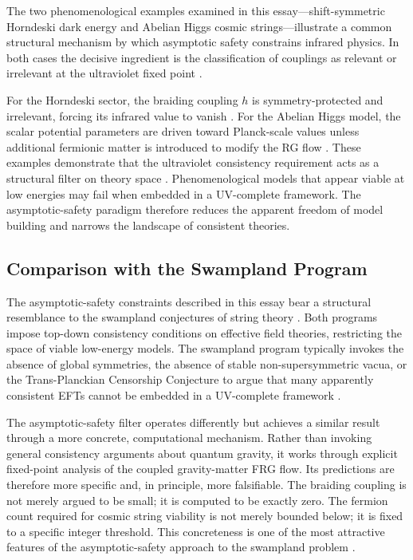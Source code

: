 \documentclass[12pt,a4paper]{article}
\begin{document}
The two phenomenological examples examined in this essay---shift-symmetric
Horndeski dark energy and Abelian Higgs cosmic strings---illustrate a common
structural mechanism by which asymptotic safety constrains infrared physics.
In both cases the decisive ingredient is the classification of couplings as
relevant or irrelevant at the ultraviolet fixed point \cite{Eichhorn2019,
EichhornSchiffer2022handbook}.

For the Horndeski sector, the braiding coupling $h$ is symmetry-protected and
irrelevant, forcing its infrared value to vanish \cite{EichhornLinoWagner2023}.
For the Abelian Higgs model, the scalar potential parameters are driven toward
Planck-scale values unless additional fermionic matter is introduced to modify
the RG flow \cite{EichhornLinoMiqueleto2023}. These examples demonstrate that
the ultraviolet consistency requirement acts as a structural filter on theory
space \cite{BuoninfanteEtal2025}. Phenomenological models that appear viable
at low energies may fail when embedded in a UV-complete framework. The
asymptotic-safety paradigm therefore reduces the apparent freedom of model
building and narrows the landscape of consistent theories.

\subsection{Comparison with the Swampland Program}

The asymptotic-safety constraints described in this essay bear a structural
resemblance to the swampland conjectures of string theory \cite{EichhornHebeckerPawlowskiWalcher2024}.
Both programs impose top-down consistency conditions on effective field theories,
restricting the space of viable low-energy models. The swampland program
typically invokes the absence of global symmetries, the absence of stable
non-supersymmetric vacua, or the Trans-Planckian Censorship Conjecture to
argue that many apparently consistent EFTs cannot be embedded in a
UV-complete framework \cite{EichhornHebeckerPawlowskiWalcher2024}.

The asymptotic-safety filter operates differently but achieves a similar
result through a more concrete, computational mechanism. Rather than invoking
general consistency arguments about quantum gravity, it works through explicit
fixed-point analysis of the coupled gravity-matter FRG flow. Its predictions
are therefore more specific and, in principle, more falsifiable. The braiding
coupling is not merely argued to be small; it is computed to be exactly zero.
The fermion count required for cosmic string viability is not merely bounded
below; it is fixed to a specific integer threshold. This concreteness is one
of the most attractive features of the asymptotic-safety approach to the
swampland problem \cite{EichhornHebeckerPawlowskiWalcher2024,
EichhornSchiffer2022handbook}.
\end{document}
